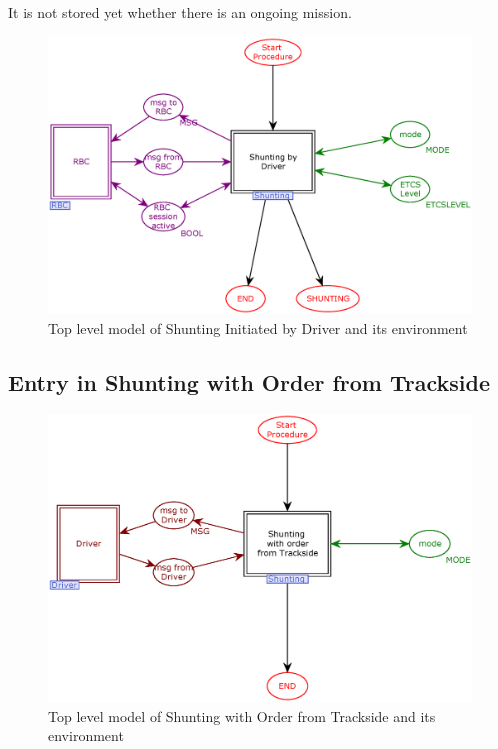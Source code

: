 \documentclass{template/openetcs_article}
\begin{document}
It is not stored yet whether there is an ongoing mission.

\begin{figure}[htb] 
  \centering
  \includegraphics[scale=0.5]{ShuntingDriver-toplevel.eps}
  \caption{Top level model of Shunting Initiated by Driver and its environment}
  \label{fig:SD-toplevel}
\end{figure}

\subsection{Entry in Shunting with Order from Trackside}
\begin{figure}[htb] 
  \centering
  \includegraphics[scale=0.5]{ShuntingTrackside-toplevel.eps}
  \caption{Top level model of Shunting with Order from Trackside and its environment}
  \label{fig:ST-toplevel}
\end{figure}
\end{document}
